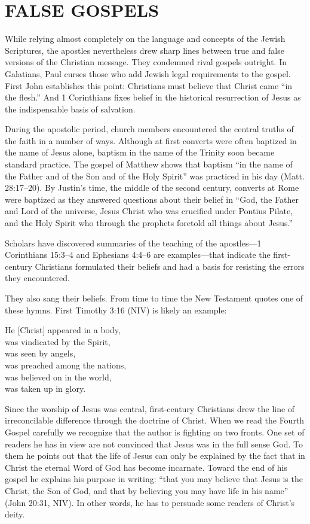 \section{FALSE GOSPELS}

While relying almost completely on the language and concepts of the Jewish Scriptures, the apostles
nevertheless drew sharp lines between true and false versions of the Christian message. They
condemned rival gospels outright. In Galatians, Paul curses those who add Jewish legal requirements
to the gospel. First John establishes this point: Christians must believe that Christ came “in the
flesh.” And 1 Corinthians fixes belief in the historical resurrection of Jesus as the indispensable
basis of salvation.

During the apostolic period, church members encountered the central truths of the faith in a number
of ways. Although at first converts were often baptized in the name of Jesus alone, baptism in the
name of the Trinity soon became standard practice. The gospel of Matthew shows that baptism “in the
name of the Father and of the Son and of the Holy Spirit” was practiced in his day (Matt. 28:17–20).
By Justin’s time, the middle of the second century, converts at Rome were baptized as they answered
questions about their belief in “God, the Father and Lord of the universe, Jesus Christ who was
crucified under Pontius Pilate, and the Holy Spirit who through the prophets foretold all things
about Jesus.”

Scholars have discovered summaries of the teaching of the apostles—1 Corinthians 15:3–4 and
Ephesians 4:4–6 are examples—that indicate the first-century Christians formulated their beliefs and
had a basis for resisting the errors they encountered.

They also sang their beliefs. From time to time the New Testament quotes one of these hymns. First
Timothy 3:16 (NIV) is likely an example:

\begin{poem}
He [Christ] appeared in a body,\\
was vindicated by the Spirit,\\
was seen by angels,\\
was preached among the nations,\\
was believed on in the world,\\
was taken up in glory.
\end{poem}

Since the worship of Jesus was central, first-century Christians drew the line of irreconcilable
difference through the doctrine of Christ. When we read the Fourth Gospel carefully we recognize
that the author is fighting on two fronts. One set of readers he has in view are not convinced that
Jesus was in the full sense God. To them he points out that the life of Jesus can only be explained
by the fact that in Christ the eternal Word of God has become incarnate. Toward the end of his
gospel he explains his purpose in writing: “that you may believe that Jesus is the Christ, the Son
of God, and that by believing you may have life in his name” (John 20:31, NIV). In other words, he
has to persuade some readers of Christ’s deity.

